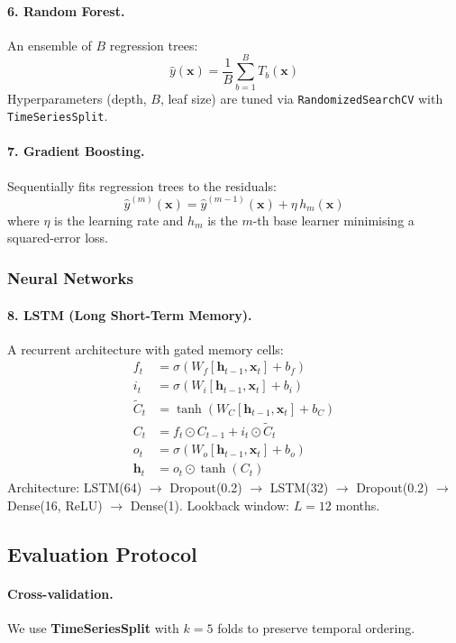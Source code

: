 \documentclass[12pt,a4paper]{article}
\newcommand{\bx}{\mathbf{x}}
\begin{document}
\begin{table}[H]
\paragraph{6. Random Forest.}
An ensemble of $B$ regression trees:
$$\hat{y}(\bx) = \frac{1}{B}\sum_{b=1}^{B} T_b(\bx)$$
Hyperparameters (depth, $B$, leaf size) are tuned via
\texttt{RandomizedSearchCV} with \texttt{TimeSeriesSplit}.

\paragraph{7. Gradient Boosting.}
Sequentially fits regression trees to the residuals:
$$\hat{y}^{(m)}(\bx) = \hat{y}^{(m-1)}(\bx) + \eta\,h_m(\bx)$$
where $\eta$ is the learning rate and $h_m$ is the $m$-th base learner
minimising a squared-error loss.

\subsubsection{Neural Networks}

\paragraph{8. LSTM (Long Short-Term Memory).}
A recurrent architecture with gated memory cells:
\begin{align}
    f_t &= \sigma(W_f [\mathbf{h}_{t-1}, \bx_t] + b_f) \label{eq:forget}\\
    i_t &= \sigma(W_i [\mathbf{h}_{t-1}, \bx_t] + b_i) \\
    \tilde{C}_t &= \tanh(W_C [\mathbf{h}_{t-1}, \bx_t] + b_C) \\
    C_t &= f_t \odot C_{t-1} + i_t \odot \tilde{C}_t \\
    o_t &= \sigma(W_o [\mathbf{h}_{t-1}, \bx_t] + b_o) \\
    \mathbf{h}_t &= o_t \odot \tanh(C_t)
\end{align}
Architecture: LSTM(64) $\to$ Dropout(0.2) $\to$ LSTM(32) $\to$
Dropout(0.2) $\to$ Dense(16, ReLU) $\to$ Dense(1).
Lookback window: $L = 12$ months.

\subsection{Evaluation Protocol}

\paragraph{Cross-validation.}
We use \textbf{TimeSeriesSplit} with $k=5$ folds to preserve temporal
ordering.


\end{table}
\end{document}
